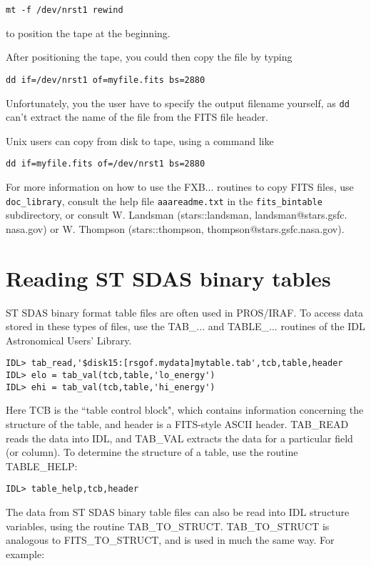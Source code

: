 \medskip\noindent
\begin{verbatim}
mt -f /dev/nrst1 rewind
\end{verbatim}
to position the tape at the beginning.
 
After positioning the tape, you could then copy the file by typing

\medskip\noindent
\begin{verbatim}
dd if=/dev/nrst1 of=myfile.fits bs=2880
\end{verbatim}
Unfortunately, you the user have to specify the output filename yourself,
as {\tt dd} can't extract the name of the file from the FITS file header.
 
Unix users can copy from disk to tape, using a command like

\medskip\noindent
\begin{verbatim}
dd if=myfile.fits of=/dev/nrst1 bs=2880
\end{verbatim}
For more information on how to use the FXB... routines to copy FITS files, use
{\tt doc{\_}library}, consult the help file {\tt aaareadme.txt} in the {\tt fits{\_}bintable}
subdirectory, or consult W. Landsman (stars::landsman, landsman@stars.gsfc.
nasa.gov) or W. Thompson (stars::thompson, thompson@stars.gsfc.nasa.gov).
 

\section{Reading ST SDAS binary tables}
 
ST SDAS binary format table files are often used in PROS/IRAF. To access data
stored in these types of files, use the TAB{\_}... and TABLE{\_}... routines of the
IDL Astronomical Users' Library.

\medskip\noindent
\begin{verbatim}
IDL> tab_read,'$disk15:[rsgof.mydata]mytable.tab',tcb,table,header
IDL> elo = tab_val(tcb,table,'lo_energy')
IDL> ehi = tab_val(tcb,table,'hi_energy')
\end{verbatim}
Here TCB is the ``table control block", which contains information concerning
the structure of the table, and header is a FITS-style ASCII header. TAB{\_}READ
reads the data into IDL, and TAB{\_}VAL extracts the data for a particular field
(or column). To determine the structure of a table, use the routine TABLE{\_}HELP:

\medskip\noindent
\begin{verbatim}
IDL> table_help,tcb,header
\end{verbatim}
The data from ST SDAS binary table files can also be read into IDL
structure variables, using the routine TAB{\_}TO{\_}STRUCT. TAB{\_}TO{\_}STRUCT is
analogous to FITS{\_}TO{\_}STRUCT, and is used in much the same way. For example:


